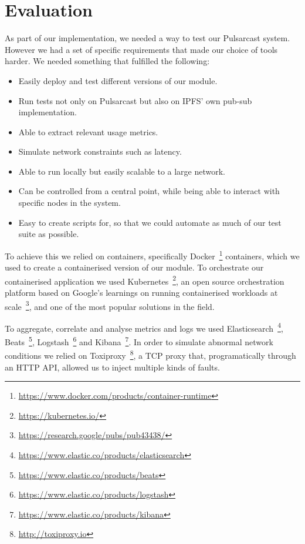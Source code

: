 
\section{Evaluation}
\label{section:evaluation}

As part of our implementation, we needed a way to test our Pulsarcast system.
However we had a set of specific requirements that made our choice of tools
harder. We needed something that fulfilled the following:

\begin{itemize}
  \item Easily deploy and test different versions of our module.
  \item Run tests not only on Pulsarcast but also on IPFS' own pub-sub
    implementation.
  \item Able to extract relevant usage metrics.
  \item Simulate network constraints such as latency.
  \item Able to run locally but easily scalable to a large network.
  \item Can be controlled from a central point, while being able to interact
    with specific nodes in the system.
  \item Easy to create scripts for, so that we could automate as much of our
    test suite as possible.
\end{itemize}

To achieve this we relied on containers, specifically
Docker~\footnote{\url{https://www.docker.com/products/container-runtime}}
containers, which we used to create a containerised version of our module. To
orchestrate our containerised application we used
Kubernetes~\footnote{\url{https://kubernetes.io/}}, an open source
orchestration platform based on Google's learnings on running containerised
workloads at scale~\footnote{\url{https://research.google/pubs/pub43438/}}, and
one of the most popular solutions in the field.

To aggregate, correlate and analyse metrics and logs we used
Elasticsearch~\footnote{\url{https://www.elastic.co/products/elasticsearch}},
Beats~\footnote{\url{https://www.elastic.co/products/beats}},
Logstash~\footnote{\url{https://www.elastic.co/products/logstash}} and
Kibana~\footnote{\url{https://www.elastic.co/products/kibana}}. In order to
simulate abnormal network conditions we relied on
Toxiproxy~\footnote{\url{http://toxiproxy.io}}, a TCP proxy that,
programatically through an HTTP API, allowed us to inject multiple kinds of
faults.

